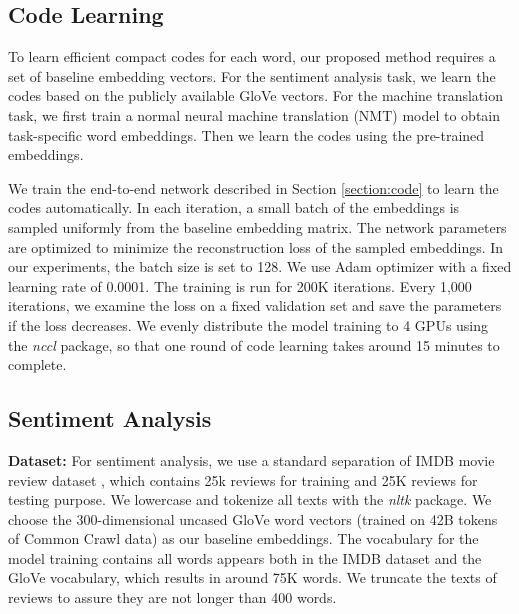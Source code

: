 \documentclass{article} %
\begin{document}
\subsection{Code Learning}

To learn efficient compact codes for each word, our proposed method requires a set of baseline embedding vectors. For the sentiment analysis task, we learn the codes based on the publicly available GloVe vectors. For the machine translation task, we first train a normal neural machine translation (NMT) model to obtain task-specific word embeddings. Then we learn the codes using the pre-trained embeddings.

We train the end-to-end network described in Section \ref{section:code} to learn the codes automatically. In each iteration, a small batch of the embeddings is sampled uniformly from the baseline embedding matrix. The network parameters are optimized to minimize the reconstruction loss of the sampled embeddings. In our experiments, the batch size is set to 128. We use Adam optimizer \citep{kingma2014adam} with a fixed learning rate of 0.0001. The training is run for 200K iterations. Every 1,000 iterations, we examine the loss on a fixed validation set and save the parameters if the loss decreases. We evenly distribute the model training to 4 GPUs using the {\it nccl} package, so that one round of code learning takes around 15 minutes to complete.

\subsection{Sentiment Analysis}
\label{section:imdb}

{\bf Dataset:} \: For sentiment analysis, we use a standard separation of IMDB movie review dataset \citep{Maas2011LearningWV}, which contains 25k reviews for training and 25K reviews for testing purpose. We lowercase and tokenize all texts with the {\it nltk} package. We choose the 300-dimensional uncased GloVe word vectors (trained on 42B tokens of Common Crawl data) as our baseline embeddings. The vocabulary for the model training contains all words appears both in the IMDB dataset and the GloVe vocabulary, which results in around 75K words. We truncate the texts of reviews to assure they are not longer than 400 words. %
\end{document}

